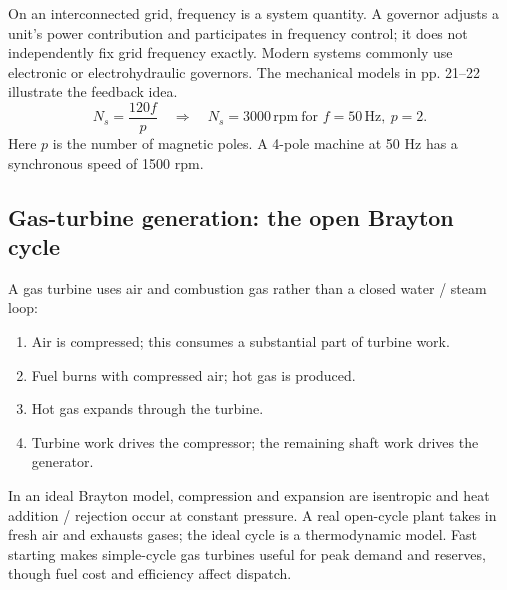 \documentclass[11pt,a4paper]{article}
\begin{document}
On an interconnected grid, frequency is a system quantity. A governor adjusts a unit's power contribution and participates in frequency control; it does not independently fix grid frequency exactly. Modern systems commonly use electronic or electrohydraulic governors. The mechanical models in pp. 21--22 illustrate the feedback idea.
\[
N_s=\frac{120f}{p}\quad\Rightarrow\quad N_s=3000\,\mathrm{rpm}
\ \text{for }f=50\,\mathrm{Hz},\ p=2.
\]
Here $p$ is the number of magnetic poles. A 4-pole machine at 50 Hz has a synchronous speed of 1500 rpm.

\subsection{Gas-turbine generation: the open Brayton cycle}
A gas turbine uses air and combustion gas rather than a closed water / steam loop:
\begin{center}
\end{center}
\begin{enumerate}
\item Air is compressed; this consumes a substantial part of turbine work.
\item Fuel burns with compressed air; hot gas is produced.
\item Hot gas expands through the turbine.
\item Turbine work drives the compressor; the remaining shaft work drives the generator.
\end{enumerate}
In an ideal Brayton model, compression and expansion are isentropic and heat addition / rejection occur at constant pressure. A real open-cycle plant takes in fresh air and exhausts gases; the ideal cycle is a thermodynamic model. Fast starting makes simple-cycle gas turbines useful for peak demand and reserves, though fuel cost and efficiency affect dispatch.
\end{document}
